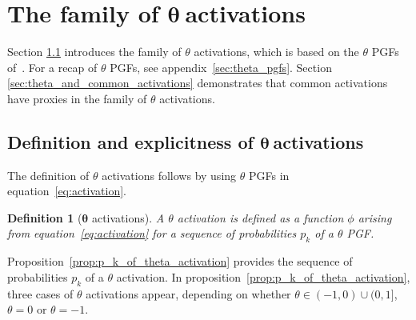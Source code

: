 \documentclass[final, 12pt]{colt2021} %
\newtheorem{dfn}{Definition}
\begin{document}

\section{The family of \texorpdfstring{$\boldsymbol{\theta}~$} aactivations}
\label{theta_activations}

Section \ref{sec:activation}
introduces the family of $\theta$ activations,
which is based on the $\theta$ PGFs of~\citet{sagitov2016}.
For a recap of $\theta$ PGFs,
see appendix~\ref{sec:theta_pgfs}.
Section \ref{sec:theta_and_common_activations}
demonstrates that
common activations have proxies in the family of $\theta$ activations.

\subsection{Definition and explicitness
of \texorpdfstring{$\boldsymbol{\theta}~$} aactivations}
\label{sec:activation}

The definition of $\theta$ activations follows
by using $\theta$ PGFs in equation~\eqref{eq:activation}.

\begin{dfn}[$\boldsymbol{\theta}$ activations]\label{def:activation}
A $\theta$ activation is defined as
a function $\phi$ arising from equation~\eqref{eq:activation}
for a sequence of probabilities $p_k$ of a $\theta$ PGF.
\end{dfn}

Proposition~\ref{prop:p_k_of_theta_activation}
provides the sequence of probabilities $p_k$ of a $\theta$ activation.
In proposition~\ref{prop:p_k_of_theta_activation},
three cases of $\theta$ activations appear,
depending on whether
$\theta \in (-1, 0) \cup (0, 1]$,
$\theta=0$
or $\theta=-1$.
\end{document}
